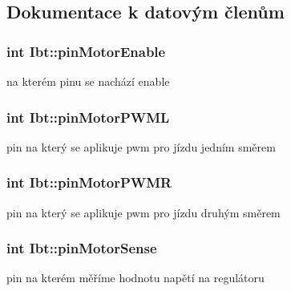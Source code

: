 \subsection{Dokumentace k datovým členům}
\subsubsection[{\texorpdfstring{pin\+Motor\+Enable}{pinMotorEnable}}]{\setlength{\rightskip}{0pt plus 5cm}int Ibt\+::pin\+Motor\+Enable\hspace{0.3cm}{\ttfamily [private]}}\hypertarget{class_ibt_ad6d59ade8bcb80ee7ee06c475a381dea}{}\label{class_ibt_ad6d59ade8bcb80ee7ee06c475a381dea}
na kterém pinu se nachází enable 
\subsubsection[{\texorpdfstring{pin\+Motor\+P\+W\+ML}{pinMotorPWML}}]{\setlength{\rightskip}{0pt plus 5cm}int Ibt\+::pin\+Motor\+P\+W\+ML\hspace{0.3cm}{\ttfamily [private]}}\hypertarget{class_ibt_a392b4ea56f7346c43b9562e77fe35722}{}\label{class_ibt_a392b4ea56f7346c43b9562e77fe35722}
pin na který se aplikuje pwm pro jízdu jedním směrem 
\subsubsection[{\texorpdfstring{pin\+Motor\+P\+W\+MR}{pinMotorPWMR}}]{\setlength{\rightskip}{0pt plus 5cm}int Ibt\+::pin\+Motor\+P\+W\+MR\hspace{0.3cm}{\ttfamily [private]}}\hypertarget{class_ibt_a7112beac87f2013be51d48203e23a1f5}{}\label{class_ibt_a7112beac87f2013be51d48203e23a1f5}
pin na který se aplikuje pwm pro jízdu druhým směrem 
\subsubsection[{\texorpdfstring{pin\+Motor\+Sense}{pinMotorSense}}]{\setlength{\rightskip}{0pt plus 5cm}int Ibt\+::pin\+Motor\+Sense\hspace{0.3cm}{\ttfamily [private]}}\hypertarget{class_ibt_ac52829806ce90d85f76320292e7027a4}{}\label{class_ibt_ac52829806ce90d85f76320292e7027a4}
pin na kterém měříme hodnotu napětí na regulátoru 
